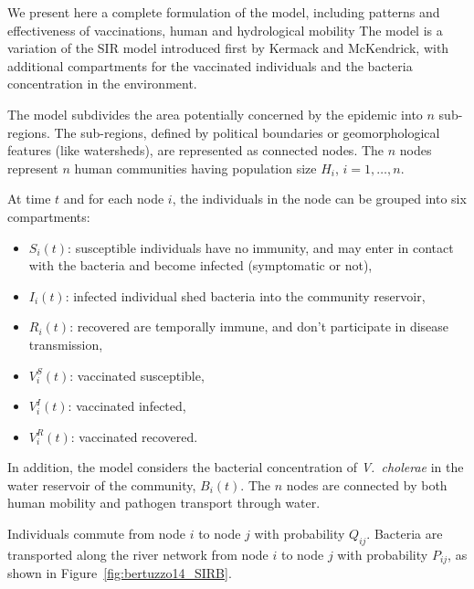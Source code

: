 We present here a complete formulation of the model, including patterns and effectiveness of vaccinations, human and hydrological mobility\cite{Bertuzzo:ProbabilityExtinctionHaiti:2016,Pasetto:RealtimeProjectionsCholera:2017}
The model is a variation of the SIR model introduced first by Kermack and McKendrick\cite{Kermack:ContributionMathematicalTheory:1927}, with additional compartments for the vaccinated individuals and the bacteria concentration in the environment.

The model subdivides the area potentially concerned by the epidemic into $n$ sub-regions. The sub-regions, defined by political boundaries or geomorphological features (like watersheds\cite{Bertuzzo:ProbabilityExtinctionHaiti:2016}), are represented as connected nodes. The $n$ nodes represent $n$ human communities having population size $H_i$, $i=1,\dots, n$. 

At time $t$ and for each node $i$, the individuals in the node can be grouped into six compartments:

\begin{itemize}
\item $S_i(t)$: susceptible individuals  have no immunity, and may enter in contact with the bacteria and become infected (symptomatic or not),
\item $I_i(t)$: infected individual shed bacteria into the community reservoir,
\item $R_i(t)$: recovered are temporally immune, and don't participate in disease transmission,
\item $V^S_i(t)$: vaccinated susceptible,
\item $V^I_i(t)$: vaccinated infected,
\item $V^R_i(t)$: vaccinated recovered.
\end{itemize}

In addition, the model considers the bacterial concentration of \textit{V.~cholerae} in the water reservoir of the community, $B_i(t)$. The $n$ nodes are connected by both human mobility and pathogen transport through water.

Individuals commute from node $i$ to node $j$ with probability $Q_{ij}$. Bacteria are transported along the river network from node $i$ to node $j$ with probability $P_{ij}$, as shown in Figure~\ref{fig:bertuzzo14_SIRB}.


